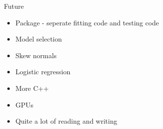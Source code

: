 \documentclass{beamer}
\begin{document}
\begin{frame}{Future}
	\begin{itemize}
		\item Package - seperate fitting code and testing code
		\item Model selection
		\item Skew normals
		\item Logistic regression
		\item More C++
		\item GPUs
		\item Quite a lot of reading and writing
	\end{itemize}
\end{frame}
\end{document}
